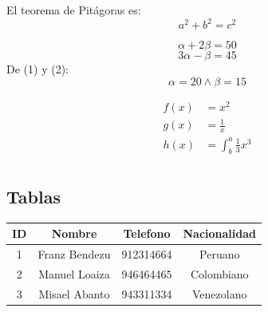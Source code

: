 \documentclass[12pt, letterpaper]{article}
\begin{document}
El teorema de Pitágoras es: $$a^2 + b^2 = c^2$$

\begin{equation}
    \alpha + 2\beta = 50
\end{equation}
\begin{equation}
    3\alpha - \beta = 45
\end{equation}
De (1) y (2):
\begin{equation*}
    \boxed{\alpha = 20 \wedge \beta = 15}
\end{equation*}

\begin{align*}
    f(x) &= x^2\\
    g(x) &= \frac{1}{x}\\
    h(x) &= \int^a_b \frac{1}{3}x^3\\
\end{align*}

\subsection{Tablas}
\begin{center}
    \begin{tabular}{|c|c|c|c|}
        \hline
        \textbf{ID} & \textbf{Nombre} & \textbf{Telefono} & \textbf{Nacionalidad}\\
        \hline
        1 & Franz Bendezu & 912314664 & Peruano\\
        \hline
        2 & Manuel Loaiza & 946464465 & Colombiano\\
        \hline
        3 & Misael Abanto & 943311334 & Venezolano\\
        \hline
    \end{tabular}
\end{center}
\end{document}
